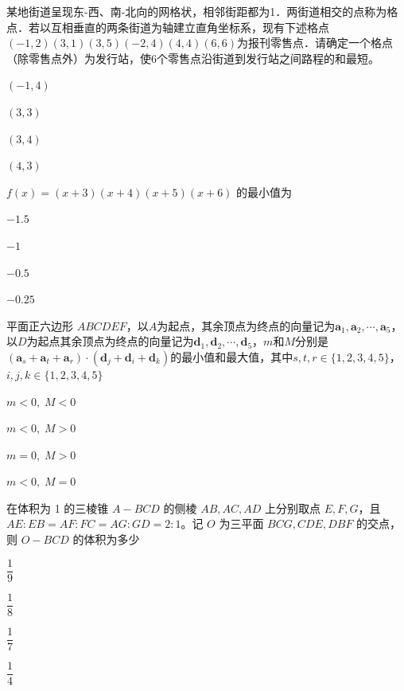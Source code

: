\documentclass{exam-zh}
\begin{document}
\begin{question}
某地街道呈现东-西、南-北向的网格状，相邻街距都为1．两街道相交的点称为格点．若以互相垂直的两条街道为轴建立直角坐标系，现有下述格点$(-1,2)(3,1)(3,5)(-2,4)(4,4)(6,6)$为报刊零售点．请确定一个格点（除零售点外）为发行站，使6个零售点沿街道到发行站之间路程的和最短。 \paren[]
\begin{choices}
  \item $(-1,4)$
  \item $(3,3)$
  \item $(3,4)$
  \item $(4,3)$
\end{choices}
\end{question}

\begin{question}
$f(x)=(x+3)(x+4)(x+5)(x+6)$ 的最小值为 \paren[]
\begin{choices}
  \item $-1.5$
  \item $-1$
  \item $-0.5$
  \item $-0.25$
\end{choices}
\end{question}

\begin{question}
平面正六边形 $ABCDEF$，以$A$为起点，其余顶点为终点的向量记为$\mathbf{a}_1,\mathbf{a}_2,\cdots,\mathbf{a}_5$，以$D$为起点其余顶点为终点的向量记为$\mathbf{d}_1,\mathbf{d}_2,\cdots,\mathbf{d}_5$，$m$和$M$分别是$(\mathbf{a}_s+\mathbf{a}_t+\mathbf{a}_r)\cdot(\mathbf{d}_j+\mathbf{d}_i+\mathbf{d}_k)$的最小值和最大值，其中$s,t,r\in\{1,2,3,4,5\}$，$i,j,k\in\{1,2,3,4,5\}$ \paren[]
\begin{choices}
  \item $m<0,\;M<0$
  \item $m<0,\;M>0$
  \item $m=0,\;M>0$
  \item $m<0,\;M=0$
\end{choices}
\end{question}

\begin{question}
在体积为 1 的三棱锥 $A-BCD$ 的侧棱 $AB,AC,AD$ 上分别取点 $E,F,G$，且 $AE:EB=AF:FC=AG:GD=2:1$。记 $O$ 为三平面 $BCG,CDE,DBF$ 的交点，则 $O-BCD$ 的体积为多少 \paren[]
\begin{choices}
  \item $\dfrac{1}{9}$
  \item $\dfrac{1}{8}$
  \item $\dfrac{1}{7}$
  \item $\dfrac{1}{4}$
\end{choices}
\end{question}
\end{document}
